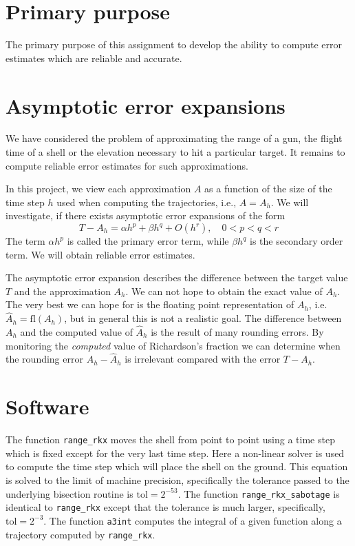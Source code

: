 \documentclass[a4paper,12pt]{article}
\newcounter{problem}
\newcommand{\be}{\begin{equation}}
\newcommand{\ee}{\end{equation}}
\begin{document}
\newpage

\maketitle
\tableofcontents


\section{Primary purpose}

The primary purpose of this assignment to develop the ability to compute error estimates which are reliable and accurate. 

\section{Asymptotic error expansions}

We have considered the problem of approximating the range of a gun, the flight time of a shell or the elevation necessary to hit a particular target. It remains to compute reliable error estimates for such approximations.

In this project, we view each approximation $A$ as a function of the size of the time step $h$ used when computing the trajectories, i.e., $A=A_h$. We will investigate, if there exists asymptotic error expansions of the form
\be \label{equ:expansion}
T - A_h = \alpha h^p + \beta h^q + O(h^r), \quad 0 < p < q < r
\ee
The term $\alpha h^p$ is called the primary error term, while $\beta h^q$ is the secondary order term. We will obtain reliable error estimates.

The asymptotic error expansion describes the difference between the target value $T$ and the approximation $A_h$. We can not hope to obtain the exact value of $A_h$. The very best we can hope for is the floating point representation of $A_h$, i.e. $\hat{A}_h = \text{fl}(A_h)$, but in general this is not a realistic goal. The difference between $A_h$ and the computed value of $\hat{A}_h$ is the result of many rounding errors. By monitoring the \emph{computed} value of Richardson's fraction we can determine when the rounding error $A_h - \hat{A}_h$ is irrelevant compared with the error $T-A_h$.

\section{Software}

The function {\tt range\_rkx} moves the shell from point to point using a time step which is fixed except for the very last time step. Here a non-linear solver is used to compute the time step which will place the shell on the ground. This equation is solved to the limit of machine precision, specifically the tolerance passed to the underlying bisection routine is  $\text{tol} = 2^{-53}$. The function {\tt range\_rkx\_sabotage} is identical to {\tt range\_rkx} except that the tolerance is much larger, specifically, $\text{tol} = 2^{-3}$. The function {\tt a3int} computes the integral of a given function along a trajectory computed by {\tt range\_rkx}.
\end{document}

